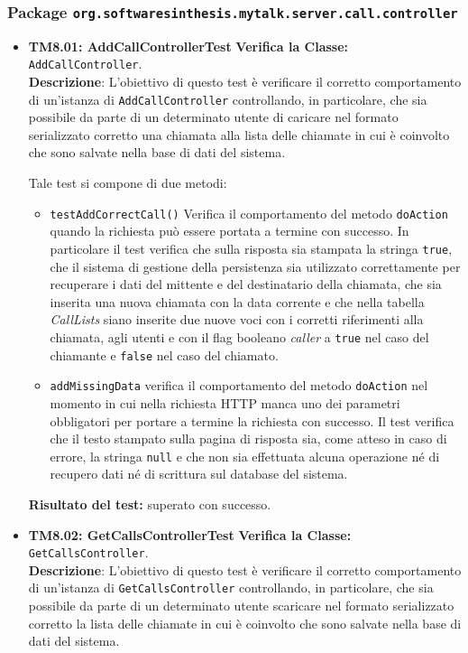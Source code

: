 \subsubsection{Package \texttt{org.softwaresinthesis.mytalk.server.call.controller}}
\begin{itemize}


\item \textbf{TM8.01: AddCallControllerTest} 
\textbf{Verifica la Classe:} \texttt{AddCallController}.\\
\textbf{Descrizione}: L'obiettivo di questo test è verificare il corretto comportamento di un'istanza di \texttt{AddCallController} controllando, in particolare, che sia possibile da parte di un determinato utente di caricare nel formato serializzato corretto una chiamata alla lista delle chiamate in cui è coinvolto che sono salvate nella base di dati del sistema.

Tale test si compone di due metodi:
\begin{itemize}
\item \texttt{testAddCorrectCall()} Verifica il comportamento del metodo \texttt{doAction} quando la richiesta può essere portata a termine con successo. In particolare il test verifica che sulla risposta sia stampata la stringa \texttt{true}, che il sistema di gestione della persistenza sia utilizzato correttamente per recuperare i dati del mittente e del destinatario della chiamata, che sia inserita una nuova chiamata con la data corrente e che nella tabella \textit{CallLists} siano inserite due nuove voci con i corretti riferimenti alla chiamata, agli utenti e con il flag booleano \textit{caller} a \texttt{true} nel caso del chiamante e \texttt{false} nel caso del chiamato.

\item \texttt{addMissingData} verifica il comportamento del metodo \texttt{doAction} nel momento in cui nella richiesta HTTP manca uno dei parametri obbligatori per portare a termine la richiesta con successo. Il test verifica che il testo stampato sulla pagina di risposta sia, come atteso in caso di errore, la stringa \texttt{null} e che non sia effettuata alcuna operazione né di recupero dati né di scrittura sul database del sistema.

\end{itemize}
\textbf{Risultato del test:} superato con successo.

\item \textbf{TM8.02: GetCallsControllerTest} 
\textbf{Verifica la Classe:} \texttt{GetCallsController}.\\
\textbf{Descrizione}: L'obiettivo di questo test è verificare il corretto comportamento di un'istanza di \texttt{GetCallsController} controllando, in particolare, che sia possibile da parte di un determinato utente scaricare nel formato serializzato corretto la lista delle chiamate in cui è coinvolto che sono salvate nella base di dati del sistema.


\end{itemize}
